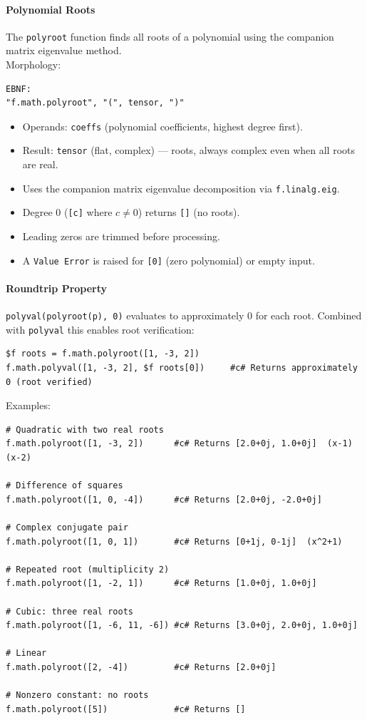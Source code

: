 \paragraph{Polynomial Roots}
The \texttt{polyroot} function finds all roots of a polynomial using the companion matrix eigenvalue method. \\ Morphology:
\begin{verbatim}
EBNF:
"f.math.polyroot", "(", tensor, ")"
\end{verbatim}
\begin{itemize}
\item Operands: \texttt{coeffs} (polynomial coefficients, highest degree first).
\item Result: \texttt{tensor} (flat, complex) --- roots, always complex even when all roots are real.
\item Uses the companion matrix eigenvalue decomposition via \texttt{f.linalg.eig}.
\item Degree 0 (\texttt{[c]} where $c \neq 0$) returns \texttt{[]} (no roots).
\item Leading zeros are trimmed before processing.
\item A \texttt{Value Error} is raised for \texttt{[0]} (zero polynomial) or empty input.
\end{itemize}
\paragraph{Roundtrip Property} \texttt{polyval(polyroot(p), 0)} evaluates to approximately 0 for each root. Combined with \texttt{polyval} this enables root verification:
\begin{verbatim}
$f roots = f.math.polyroot([1, -3, 2])
f.math.polyval([1, -3, 2], $f roots[0])     #c# Returns approximately 0 (root verified)
\end{verbatim}
Examples:
\begin{verbatim}
# Quadratic with two real roots
f.math.polyroot([1, -3, 2])      #c# Returns [2.0+0j, 1.0+0j]  (x-1)(x-2)

# Difference of squares
f.math.polyroot([1, 0, -4])      #c# Returns [2.0+0j, -2.0+0j]

# Complex conjugate pair
f.math.polyroot([1, 0, 1])       #c# Returns [0+1j, 0-1j]  (x^2+1)

# Repeated root (multiplicity 2)
f.math.polyroot([1, -2, 1])      #c# Returns [1.0+0j, 1.0+0j]

# Cubic: three real roots
f.math.polyroot([1, -6, 11, -6]) #c# Returns [3.0+0j, 2.0+0j, 1.0+0j]

# Linear
f.math.polyroot([2, -4])         #c# Returns [2.0+0j]

# Nonzero constant: no roots
f.math.polyroot([5])             #c# Returns []
\end{verbatim}

